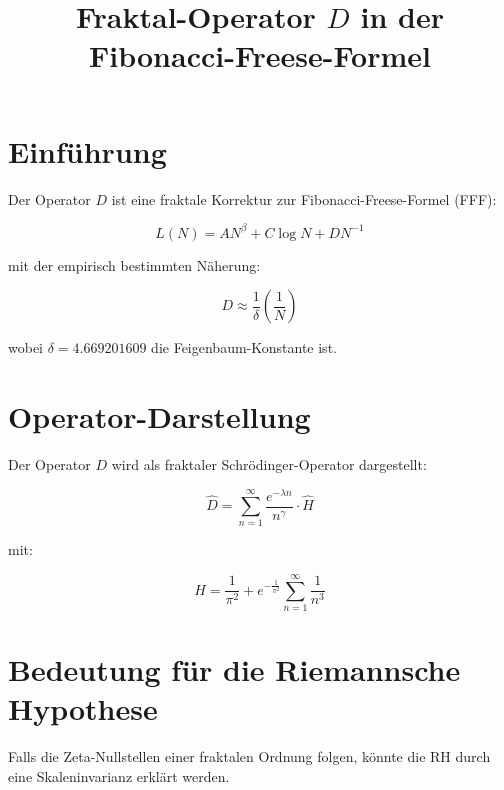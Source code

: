 \documentclass[a4paper,12pt]{article}
\begin{document}
\title{Fraktal-Operator \( D \) in der Fibonacci-Freese-Formel}
\author{}
\date{}
\maketitle

\section{Einführung}
Der Operator \( D \) ist eine fraktale Korrektur zur Fibonacci-Freese-Formel (FFF):

\[
L(N) = A N^\beta + C \log N + D N^{-1}
\]

mit der empirisch bestimmten Näherung:

\[
D \approx \frac{1}{\delta} \left( \frac{1}{N} \right)
\]

wobei \( \delta = 4.669201609 \) die Feigenbaum-Konstante ist.

\section{Operator-Darstellung}
Der Operator \( D \) wird als fraktaler Schrödinger-Operator dargestellt:

\[
\hat{D} = \sum_{n=1}^{\infty} \frac{e^{-\lambda n}}{n^\gamma} \cdot \hat{H}
\]

mit:

\[
\hat{H} = \frac{1}{\pi^2} + e^{-\frac{1}{\pi^2}} \sum_{n=1}^{\infty} \frac{1}{n^3}
\]

\section{Bedeutung für die Riemannsche Hypothese}
Falls die Zeta-Nullstellen einer fraktalen Ordnung folgen, könnte die RH durch eine Skaleninvarianz erklärt werden.
\end{document}
